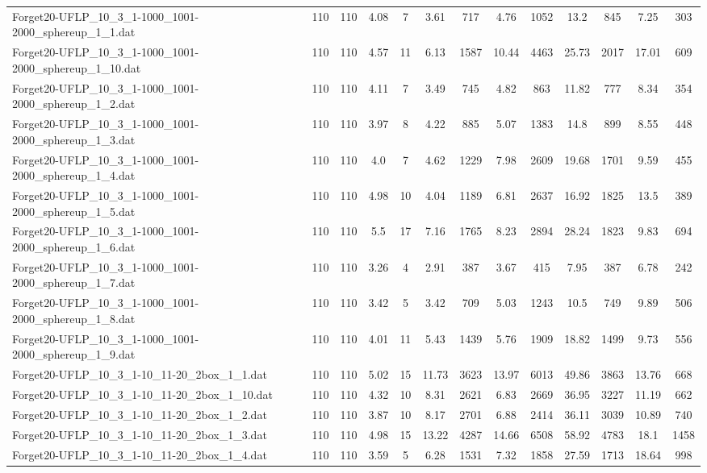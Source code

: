 \begin{table}[!ht]
{\begin{tabular}{lcccccccccccc}
Forget20-UFLP\_10\_3\_1-1000\_1001-2000\_sphereup\_1\_1.dat & 110 & 110 & 4.08 & 7 & 3.61 & 717 & 4.76 & 1052 & 13.2 & 845 & 7.25 & 303 \\
Forget20-UFLP\_10\_3\_1-1000\_1001-2000\_sphereup\_1\_10.dat & 110 & 110 & 4.57 & 11 & 6.13 & 1587 & 10.44 & 4463 & 25.73 & 2017 & 17.01 & 609 \\
Forget20-UFLP\_10\_3\_1-1000\_1001-2000\_sphereup\_1\_2.dat & 110 & 110 & 4.11 & 7 & 3.49 & 745 & 4.82 & 863 & 11.82 & 777 & 8.34 & 354 \\
Forget20-UFLP\_10\_3\_1-1000\_1001-2000\_sphereup\_1\_3.dat & 110 & 110 & 3.97 & 8 & 4.22 & 885 & 5.07 & 1383 & 14.8 & 899 & 8.55 & 448 \\
Forget20-UFLP\_10\_3\_1-1000\_1001-2000\_sphereup\_1\_4.dat & 110 & 110 & 4.0 & 7 & 4.62 & 1229 & 7.98 & 2609 & 19.68 & 1701 & 9.59 & 455 \\
Forget20-UFLP\_10\_3\_1-1000\_1001-2000\_sphereup\_1\_5.dat & 110 & 110 & 4.98 & 10 & 4.04 & 1189 & 6.81 & 2637 & 16.92 & 1825 & 13.5 & 389 \\
Forget20-UFLP\_10\_3\_1-1000\_1001-2000\_sphereup\_1\_6.dat & 110 & 110 & 5.5 & 17 & 7.16 & 1765 & 8.23 & 2894 & 28.24 & 1823 & 9.83 & 694 \\
Forget20-UFLP\_10\_3\_1-1000\_1001-2000\_sphereup\_1\_7.dat & 110 & 110 & 3.26 & 4 & 2.91 & 387 & 3.67 & 415 & 7.95 & 387 & 6.78 & 242 \\
Forget20-UFLP\_10\_3\_1-1000\_1001-2000\_sphereup\_1\_8.dat & 110 & 110 & 3.42 & 5 & 3.42 & 709 & 5.03 & 1243 & 10.5 & 749 & 9.89 & 506 \\
Forget20-UFLP\_10\_3\_1-1000\_1001-2000\_sphereup\_1\_9.dat & 110 & 110 & 4.01 & 11 & 5.43 & 1439 & 5.76 & 1909 & 18.82 & 1499 & 9.73 & 556 \\
Forget20-UFLP\_10\_3\_1-10\_11-20\_2box\_1\_1.dat & 110 & 110 & 5.02 & 15 & 11.73 & 3623 & 13.97 & 6013 & 49.86 & 3863 & 13.76 & 668 \\
Forget20-UFLP\_10\_3\_1-10\_11-20\_2box\_1\_10.dat & 110 & 110 & 4.32 & 10 & 8.31 & 2621 & 6.83 & 2669 & 36.95 & 3227 & 11.19 & 662 \\
Forget20-UFLP\_10\_3\_1-10\_11-20\_2box\_1\_2.dat & 110 & 110 & 3.87 & 10 & 8.17 & 2701 & 6.88 & 2414 & 36.11 & 3039 & 10.89 & 740 \\
Forget20-UFLP\_10\_3\_1-10\_11-20\_2box\_1\_3.dat & 110 & 110 & 4.98 & 15 & 13.22 & 4287 & 14.66 & 6508 & 58.92 & 4783 & 18.1 & 1458 \\
Forget20-UFLP\_10\_3\_1-10\_11-20\_2box\_1\_4.dat & 110 & 110 & 3.59 & 5 & 6.28 & 1531 & 7.32 & 1858 & 27.59 & 1713 & 18.64 & 998 \\

\end{tabular}}
\end{table}
